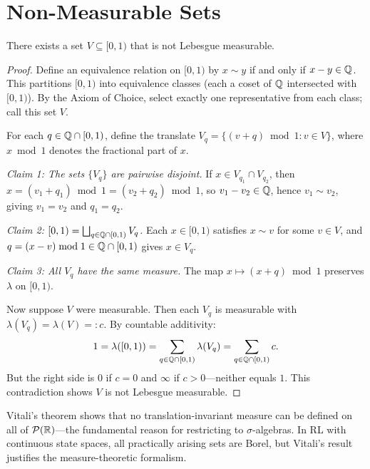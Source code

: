 \documentclass[11pt,a4paper]{article}
\begin{document}

\section{Non-Measurable Sets}
\label{sec:vitali}

\begin{theorem}
\label{thm:vitali}
There exists a set $V \subseteq [0, 1)$ that is not Lebesgue
measurable.
\end{theorem}

\begin{proof}
Define an equivalence relation on $[0, 1)$ by $x \sim y$ if and only
if $x - y \in \mathbb{Q}$. This partitions $[0, 1)$ into equivalence classes
(each a coset of $\mathbb{Q}$ intersected with $[0, 1)$). By the Axiom of
Choice, select exactly one representative from each class; call this
set $V$.

For each $q \in \mathbb{Q} \cap [0, 1)$, define the translate
$V_q = \{(v + q) \bmod 1 : v \in V\}$, where $x \bmod 1$ denotes
the fractional part of $x$.

\textit{Claim 1: The sets $\{V_q\}$ are pairwise disjoint.} If
$x \in V_{q_1} \cap V_{q_2}$, then
$x = (v_1 + q_1) \bmod 1 = (v_2 + q_2) \bmod 1$, so
$v_1 - v_2 \in \mathbb{Q}$, hence $v_1 \sim v_2$, giving $v_1 = v_2$ and
$q_1 = q_2$.

\textit{Claim 2:
$[0, 1) = \bigsqcup_{q \in \mathbb{Q} \cap [0,1)} V_q$.} Each
$x \in [0, 1)$ satisfies $x \sim v$ for some $v \in V$, and
$q = (x - v) \bmod 1 \in \mathbb{Q} \cap [0,1)$ gives $x \in V_q$.

\textit{Claim 3: All $V_q$ have the same measure.} The map
$x \mapsto (x + q) \bmod 1$ preserves $\lambda$ on $[0,1)$.

Now suppose $V$ were measurable. Then each $V_q$ is measurable with
$\lambda(V_q) = \lambda(V) =: c$. By countable additivity:
\begin{equation}
  1 = \lambda([0, 1))
    = \sum_{q \in \mathbb{Q} \cap [0,1)} \lambda(V_q)
    = \sum_{q \in \mathbb{Q} \cap [0,1)} c.
\end{equation}
But the right side is $0$ if $c = 0$ and $\infty$ if $c > 0$---neither
equals $1$. This contradiction shows $V$ is not Lebesgue measurable.
\end{proof}

\begin{remark}
Vitali's theorem shows that no translation-invariant measure can be
defined on all of $\mathcal{P}(\mathbb{R})$---the fundamental reason for
restricting to $\sigma$-algebras. In RL with continuous state spaces,
all practically arising sets are Borel, but Vitali's result justifies
the measure-theoretic formalism.
\end{remark}
\end{document}
